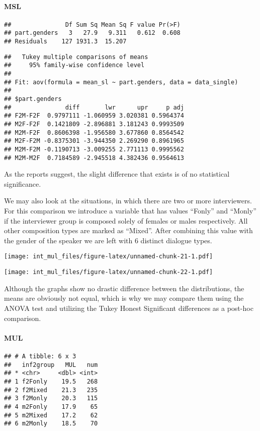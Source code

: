\documentclass[
]{article}
\begin{document}
\hypertarget{msl-3}{%
\paragraph{MSL}\label{msl-3}}

\begin{verbatim}
##               Df Sum Sq Mean Sq F value Pr(>F)
## part.genders   3   27.9   9.311   0.612  0.608
## Residuals    127 1931.3  15.207
\end{verbatim}

\begin{verbatim}
##   Tukey multiple comparisons of means
##     95% family-wise confidence level
## 
## Fit: aov(formula = mean_sl ~ part.genders, data = data_single)
## 
## $part.genders
##               diff       lwr      upr     p adj
## F2M-F2F  0.9797111 -1.060959 3.020381 0.5964374
## M2F-F2F  0.1421809 -2.896881 3.181243 0.9993509
## M2M-F2F  0.8606398 -1.956580 3.677860 0.8564542
## M2F-F2M -0.8375301 -3.944350 2.269290 0.8961965
## M2M-F2M -0.1190713 -3.009255 2.771113 0.9995562
## M2M-M2F  0.7184589 -2.945518 4.382436 0.9564613
\end{verbatim}

As the reports suggest, the slight difference that exists is of no
statistical significance.

We may also look at the situations, in which there are two or more
interviewers. For this comparison we introduce a variable that has
values ``Fonly'' and ``Monly'' if the interviewer group is composed
solely of females or males respectively. All other composition types are
marked as ``Mixed''. After combining this value with the gender of the
speaker we are left with 6 distinct dialogue types.

\texttt{[image: int\_mul\_files/figure-latex/unnamed-chunk-21-1.pdf]}

\texttt{[image: int\_mul\_files/figure-latex/unnamed-chunk-22-1.pdf]}

Although the graphs show no drastic difference between the
distributions, the means are obviously not equal, which is why we may
compare them using the ANOVA test and utilizing the Tukey Honest
Significant differences as a post-hoc comparison.

\hypertarget{mul-4}{%
\paragraph{MUL}\label{mul-4}}

\begin{verbatim}
## # A tibble: 6 x 3
##   inf2group   MUL   num
## * <chr>     <dbl> <int>
## 1 f2Fonly    19.5   268
## 2 f2Mixed    21.3   235
## 3 f2Monly    20.3   115
## 4 m2Fonly    17.9    65
## 5 m2Mixed    17.2    62
## 6 m2Monly    18.5    70
\end{verbatim}
\end{document}
